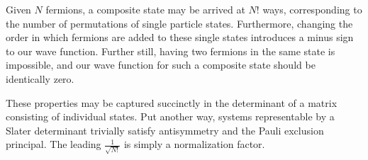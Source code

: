 \documentclass[../qft-for-the-gifted-amateur.tex]{subfiles}
\begin{document}
\begin{questions}
	\begin{solution}
	Given $N$ fermions, a composite state may be arrived at $N!$ ways,
	corresponding to the number of permutations of single particle states.
	Furthermore, changing the order in which fermions are added to these
	single states introduces a minus sign to our wave function. Further
	still, having two fermions in the same state is impossible, and our wave
	function for such a composite state should be identically zero.

	These properties may be captured succinctly in the determinant of a
	matrix consisting of individual states. Put another way, systems
	representable by a Slater determinant trivially satisfy antisymmetry and
	the Pauli exclusion principal. The leading $\frac{1}{\sqrt{N!}}$ is
	simply a normalization factor.
	\end{solution}
\end{questions}
\end{document}
